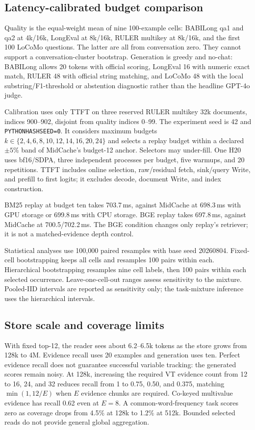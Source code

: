 \subsection{Latency-calibrated budget comparison}
\label{app:equal}


Quality is the equal-weight mean of nine 100-example cells: BABILong qa1 and qa2 at 4k/16k, LongEval at 8k/16k, RULER multikey at 8k/16k, and the first 100 LoCoMo questions. The latter are all from conversation zero. They cannot support a conversation-cluster bootstrap. Generation is greedy and no-chat: BABILong allows 20 tokens with official scoring, LongEval 16 with numeric exact match, RULER 48 with official string matching, and LoCoMo 48 with the local substring/F1-threshold or abstention diagnostic rather than the headline GPT-4o judge.

Calibration uses only TTFT on three reserved RULER multikey 32k documents, indices 900--902, disjoint from quality indices 0--99. The experiment seed is 42 and \texttt{PYTHONHASHSEED=0}. It considers maximum budgets $k\in\{2,4,6,8,10,12,14,16,20,24\}$ and selects a replay budget within a declared $\pm5\%$ band of MidCache's budget-12 anchor. Selectors may under-fill. One H20 uses bf16/SDPA, three independent processes per budget, five warmups, and 20 repetitions. TTFT includes online selection, raw/residual fetch, sink/query Write, and prefill to first logits; it excludes decode, document Write, and index construction.

BM25 replay at budget ten takes 703.7\,ms, against MidCache at 698.3\,ms with GPU storage or 699.8\,ms with CPU storage. BGE replay takes 697.8\,ms, against MidCache at 700.5/702.2\,ms. The BGE condition changes only replay's retriever; it is not a matched-evidence depth control.

Statistical analyses use 100,000 paired resamples with base seed 20260804. Fixed-cell bootstrapping keeps all cells and resamples 100 pairs within each. Hierarchical bootstrapping resamples nine cell labels, then 100 pairs within each selected occurrence. Leave-one-cell-out ranges assess sensitivity to the mixture. Pooled-IID intervals are reported as sensitivity only; the task-mixture inference uses the hierarchical intervals.

\subsection{Store scale and coverage limits}

With fixed top-12, the reader sees about 6.2--6.5k tokens as the store grows from 128k to 4M. Evidence recall uses 20 examples and generation uses ten. Perfect evidence recall does not guarantee successful variable tracking: the generated scores remain noisy. At 128k, increasing the required VT evidence count from 12 to 16, 24, and 32 reduces recall from 1 to 0.75, 0.50, and 0.375, matching $\min(1,12/E)$ when $E$ evidence chunks are required. Co-keyed multivalue evidence has recall 0.62 even at $E=8$. A common-word-frequency task scores zero as coverage drops from 4.5\% at 128k to 1.2\% at 512k. Bounded selected reads do not provide general global aggregation.
